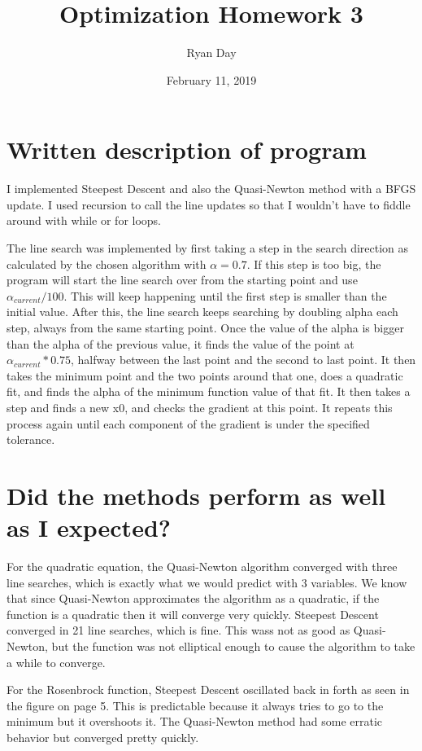 \documentclass[a4paper]{article}
\author{Ryan Day}
\title{Optimization Homework 3}
\date{February 11, 2019}
\begin{document}
    \maketitle
    \tableofcontents
    \newpage
    \section{Written description of program}
    I implemented Steepest Descent and also the Quasi-Newton method with a BFGS update. 
    I used recursion to call the line updates so that I wouldn't have to fiddle around with while or for loops.
    
    The line search was implemented by first taking a step in the search direction as calculated by the chosen algorithm with $\alpha = 0.7$.
    If this step is too big, the program will start the line search over from the starting point and use $\alpha_{current}/100$.
    This will keep happening until the first step is smaller than the initial value. 
    After this, the line search keeps searching by doubling alpha each step, always from the same starting point. 
    Once the value of the alpha is bigger than the alpha of the previous value, it finds the value of the point at $\alpha_{current}*0.75$, halfway between the last point and the second to last point.
    It then takes the minimum point and the two points around that one, does a quadratic fit, and finds the alpha of the minimum function value of that fit.
    It then takes a step and finds a new x0, and checks the gradient at this point. 
    It repeats this process again until each component of the gradient is under the specified tolerance.
    \section{Did the methods perform as well as I expected?}    
    For the quadratic equation, the Quasi-Newton algorithm converged with three line searches, which is exactly what we would predict with 3 variables.
    We know that since Quasi-Newton approximates the algorithm as a quadratic, if the function is a quadratic then it will converge very quickly.
    Steepest Descent converged in 21 line searches, which is fine. This wass not as good as Quasi-Newton, but the function was not elliptical enough to cause the algorithm to take a while to converge.
    
    For the Rosenbrock function, Steepest Descent oscillated back in forth as seen in the figure on page 5. 
    This is predictable because it always tries to go to the minimum but it overshoots it.
    The Quasi-Newton method had some erratic behavior but converged pretty quickly. 
    \newpage
\end{document}
